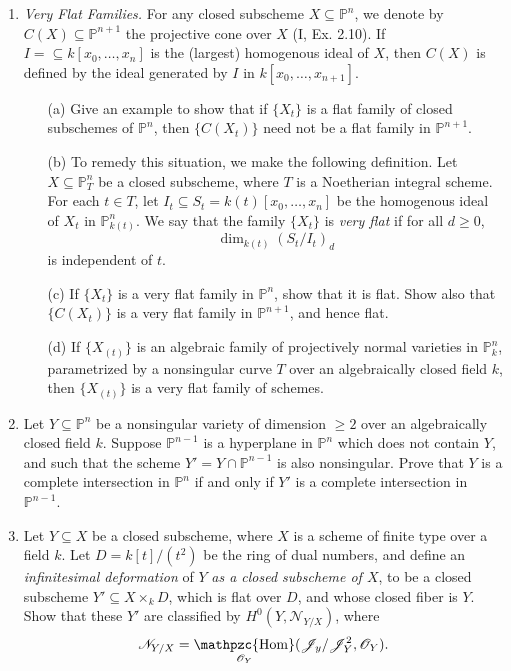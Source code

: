 \documentclass{article}
\newcommand{\fO}{\mathscr{O}}
\newcommand{\fN}{\mathscr{N}}
\newcommand{\PP}{\mathbb{P}}
\DeclareMathOperator{\rHom}{\mathpzc{Hom}}
\begin{document}
\begin{enumerate} [label=\textbf{\arabic*.}, leftmargin=0em]
\item \textit{Very Flat Families.} For any closed subscheme $X \subseteq \PP^n$, we denote by $C(X) \subseteq \PP^{n + 1}$ the projective cone over $X$ (I, Ex. 2.10). If $I = \subseteq k[x_0, \dots, x_n]$ is the (largest) homogenous ideal of $X$, then $C(X)$ is defined by the ideal generated by $I$ in $k[x_0, \dots, x_{n + 1}]$.
\begin{itemize}
  \item[(a)] Give an example to show that if $\{ X_t \}$ is a flat family of closed subschemes of $\PP^n$, then $\{ C(X_t) \}$ need not be a flat family in $\PP^{n + 1}$.
  \item[(b)] To remedy this situation, we make the following definition. Let $X \subseteq \PP_T^n$ be a closed subscheme, where $T$ is a Noetherian integral scheme. For each $t \in T$, let $I_t \subseteq S_t = k(t)[x_0, \dots, x_n]$ be the homogenous ideal of $X_t$ in $\PP_{k(t)}^n$. We say that the family $\{X_t \}$ is \textit{very flat} if for all $d \geq 0$,
  \begin{equation*}
    \dim_{k(t)}(S_t / I_t)_d
  \end{equation*}
  is independent of $t$.
  \item[(c)] If $\{X_t\}$ is a very flat family in $\PP^n$, show that it is flat. Show also that $\{ C(X_t) \}$ is a very flat family in $\PP^{n + 1}$, and hence flat.
  \item[(d)] If $\{ X_{(t)}\}$ is an algebraic family of projectively normal varieties in $\PP_k^n$, parametrized by a nonsingular curve $T$ over an algebraically closed field $k$, then $\{X_{(t)} \}$ is a very flat family of schemes.
\end{itemize}

\item Let $Y \subseteq \PP^n$ be a nonsingular variety of dimension $\geq 2$ over an algebraically closed field $k$. Suppose $\PP^{n - 1}$ is a hyperplane in $\PP^n$ which does not contain $Y$, and such that the scheme $Y' = Y \cap \PP^{n - 1}$ is also nonsingular. Prove that $Y$ is a complete intersection in $\PP^n$ if and only if $Y'$ is a complete intersection in $\PP^{n - 1}$.

\item Let $Y \subseteq X$ be a closed subscheme, where $X$ is a scheme of finite type over a field $k$. Let $D = k[t] / (t^2)$ be the ring of dual numbers, and define an \textit{infinitesimal deformation} of $Y$ \textit{as a closed subscheme of $X$}, to be a closed subscheme $Y' \subseteq X \times_k D$, which is flat over $D$, and whose closed fiber is $Y$. Show that these $Y'$ are classified by $H^0(Y, \fN_{Y/X})$, where
\begin{equation*}
  \fN_{Y/X} = \rHom_{\fO_Y}(\mathscr{J}_y/\mathscr{J}_Y^2, \fO_Y).
\end{equation*}


\end{enumerate}
\end{document}
